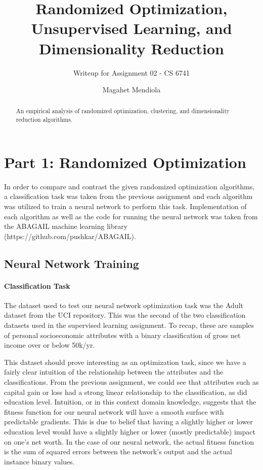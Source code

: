 \documentclass{sig-alternate}
\begin{document}
\title{Randomized Optimization, Unsupervised Learning, and Dimensionality Reduction}
\subtitle{Writeup for Assignment 02 - CS 6741}

\author{
\alignauthor
Magahet Mendiola
}
\date{}

\maketitle
\begin{abstract}
An empirical analysis of randomized optimization, clustering, and dimensionality reduction algorithms.
\end{abstract}

\section{Part 1: Randomized Optimization}

In order to compare and contrast the given randomized optimization algorithms, a classification task was taken from the previous assignment and each algorithm was utilized to train a neural network to perform this task. Implementation of each algorithm as well as the code for running the neural network was taken from the ABAGAIL machine learning library (https://github.com/pushkar/ABAGAIL).

\subsection{Neural Network Training}

\paragraph{Classification Task}

The dataset used to test our neural network optimization task was the Adult dataset from the UCI repository. This was the second of the two classification datasets used in the supervised learning assignment. To recap, these are samples of personal socioeconomic attributes with a binary classification of gross net income over or below 50k/yr.

This dataset should prove interesting as an optimization task, since we have a fairly clear intuition of the relationship between the attributes and the classifications. From the previous assignment, we could see that attributes such as capital gain or loss had a strong linear relationship to the classification, as did education level. Intuition, or in this context domain knowledge, suggests that the fitness function for our neural network will have a smooth surface with predictable gradients. This is due to belief that having a slightly higher or lower education level would have a slightly higher or lower (mostly predictable) impact on one's net worth. In the case of our neural network, the actual fitness function is the sum of squared errors between the network's output and the actual instance binary values.
\end{document}
